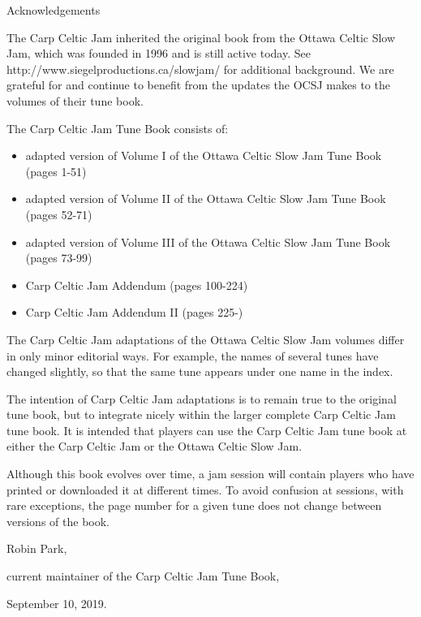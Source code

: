 \documentclass[10pt,fleqn]{article}
\begin{document}
\pagestyle{empty}
\setlength{\parindent}{0pt}
\setlength{\parskip}{1em}
\begin{center}
\LARGE
Acknowledgements
\normalsize
\end{center}

The Carp Celtic Jam inherited the original book from the Ottawa Celtic Slow Jam, which was founded in 1996 and is still active today.  See http://www.siegelproductions.ca/slowjam/ for additional background.  We are grateful for and continue to benefit from the updates the OCSJ makes to the volumes of their tune book.

The Carp Celtic Jam Tune Book consists of:
\begin{itemize}
\item adapted version of Volume I of the Ottawa Celtic Slow Jam Tune Book (pages 1-51)
\item adapted version of Volume II of the Ottawa Celtic Slow Jam Tune Book (pages 52-71)
\item adapted version of Volume III of the Ottawa Celtic Slow Jam Tune Book (pages 73-99)
\item Carp Celtic Jam Addendum (pages 100-224)
\item Carp Celtic Jam Addendum II (pages 225-)
\end{itemize}

The Carp Celtic Jam adaptations of the Ottawa Celtic Slow Jam volumes differ in only minor editorial ways.  For example, the names of several tunes have changed slightly, so that the same tune appears under one name in the index.

The intention of Carp Celtic Jam adaptations is to remain true to the original tune book, but to integrate nicely within the larger complete Carp Celtic Jam tune book.  It is intended that players can use the Carp Celtic Jam tune book at either the Carp Celtic Jam or the Ottawa Celtic Slow Jam.

Although this book evolves over time, a jam session will contain players who have printed or downloaded it at different times.  To avoid confusion at sessions, with rare exceptions, the page number for a given tune does not change between versions of the book.

\begin{flushright}
\setlength{\parskip}{0pt}
Robin Park,

current maintainer of the Carp Celtic Jam Tune Book,

September 10, 2019.
\end{flushright}
\end{document}
